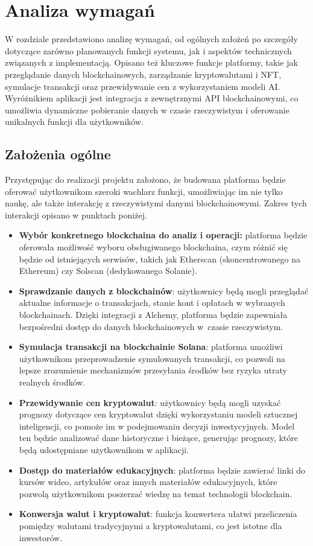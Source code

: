 \chapter{Analiza wymagań}
W rozdziale przedstawiono analizę wymagań, od ogólnych założeń po szczegóły dotyczące zarówno planowanych funkcji systemu, jak i aspektów technicznych związanych z implementacją. Opisano też kluczowe funkcje platformy, takie jak przeglądanie danych blockchainowych, zarządzanie kryptowalutami i NFT, symulacje transakcji oraz przewidywanie cen z wykorzystaniem modeli AI. Wyróżnikiem aplikacji jest integracja z zewnętrznymi API blockchainowymi, co umożliwia dynamiczne pobieranie danych w czasie rzeczywistym i oferowanie unikalnych funkcji dla użytkowników.

\section{Założenia ogólne}
Przystępując do realizacji projektu założono, że budowana platforma będzie oferować użytkownikom szeroki wachlarz funkcji, umożliwiając im nie tylko naukę, ale także interakcję z rzeczywistymi danymi blockchainowymi. Zakres tych interakcji opisano w punktach poniżej.
\begin{itemize}
\item \textbf{Wybór konkretnego blockchaina do analiz i operacji:} platforma będzie oferowała możliwość wyboru obsługiwanego blockchaina, czym różnić się będzie od istniejących serwisów, takich jak Etherscan (skoncentrowanego na Ethereum) czy Solscan (dedykowanego Solanie).
\item \textbf{Sprawdzanie danych z blockchainów}: użytkownicy będą mogli przeglądać aktualne informacje o transakcjach, stanie kont i opłatach w wybranych blockchainach. Dzięki integracji z Alchemy, platforma będzie zapewniała bezpośredni dostęp do danych blockchainowych w~czasie rzeczywistym. 
\item \textbf{Symulacja transakcji na blockchainie Solana}: platforma umożliwi użytkownikom przeprowadzenie symulowanych transakcji, co pozwoli na lepsze zrozumienie mechanizmów przesyłania środków bez ryzyka utraty realnych środków. 
\item \textbf{Przewidywanie cen kryptowalut}: użytkownicy będą mogli uzyskać prognozy dotyczące cen kryptowalut dzięki wykorzystaniu modeli sztucznej inteligencji, co pomoże im w podejmowaniu decyzji inwestycyjnych. Model ten będzie analizować dane historyczne i bieżące, generując prognozy, które będą udostępniane użytkownikom w aplikacji.
\item \textbf{Dostęp do materiałów edukacyjnych}: platforma będzie zawierać linki do kursów wideo, artykułów oraz innych materiałów edukacyjnych, które pozwolą użytkownikom poszerzać wiedzę na temat technologii blockchain. 
\item \textbf{Konwersja walut i kryptowalut}: funkcja konwertera ułatwi przeliczenia pomiędzy walutami tradycyjnymi a kryptowalutami, co jest istotne dla inwestorów. 
\end{itemize}
